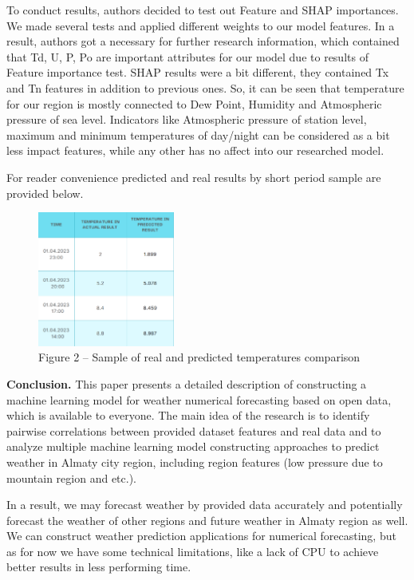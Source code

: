 \begin{multicols}{2}
To conduct results, authors decided to test out Feature and SHAP
importances. We made several tests and applied different weights to our
model features. In a result, authors got a necessary for further
research information, which contained that Td, U, P, Po are important
attributes for our model due to results of Feature importance test. SHAP
results were a bit different, they contained Tx and Tn features in
addition to previous ones. So, it can be seen that temperature for our
region is mostly connected to Dew Point, Humidity and Atmospheric
pressure of sea level. Indicators like Atmospheric pressure of station
level, maximum and minimum temperatures of day/night can be considered
as a bit less impact features, while any other has no affect into our
researched model.

For reader convenience predicted and real results by short period sample
are provided below.

\begin{figure}[H]
	\centering
	\includegraphics[width=0.4\textwidth]{assets/37}
	\caption*{Figure 2 -- Sample of real and predicted temperatures comparison}
\end{figure}

{\bfseries Conclusion.} This paper presents a detailed description of
constructing a machine learning model for weather numerical forecasting
based on open data, which is available to everyone. The main idea of the
research is to identify pairwise correlations between provided dataset
features and real data and to analyze multiple machine learning model
constructing approaches to predict weather in Almaty city region,
including region features (low pressure due to mountain region and
etc.).

In a result, we may forecast weather by provided data accurately and
potentially forecast the weather of other regions and future weather in
Almaty region as well. We can construct weather prediction applications
for numerical forecasting, but as for now we have some technical
limitations, like a lack of CPU to achieve better results in less
performing time.
\end{multicols}

